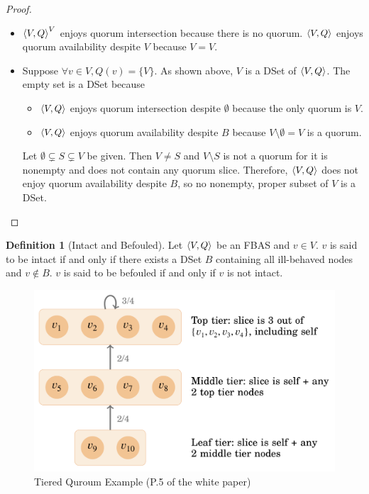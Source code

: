 \documentclass[12pt, psamsfonts]{amsart}
\theoremstyle{definition}
\newtheorem{defn}[thm]{Definition}
\theoremstyle{remark}
\numberwithin{equation}{subsection}
\begin{document}
\begin{proof}
    $ $
    \begin{itemize}
        \item
            $\ev{V, Q}^V$ enjoys quorum intersection because there is no quorum.
            $\ev{V, Q}$ enjoys quorum availability despite $V$ because $V = V$.
        \item
            Suppose $\forall v \in V, Q(v) = \{ V \}$.
            As shown above, $V$ is a DSet of $\ev{V, Q}$.
            The empty set is a DSet because
            \begin{itemize}
                \item
                    $\ev{V, Q}$ enjoys quorum intersection despite $\emptyset$ because the only quorum is $V$.
                \item
                    $\ev{V, Q}$ enjoys quorum availability despite $B$ because $V \setminus \emptyset = V$ is a quorum.
            \end{itemize}
            Let $\emptyset \subsetneq S \subsetneq V$ be given.
            Then $V \ne S$ and $V \setminus S$ is not a quorum for it is nonempty and does not contain any quorum slice.
            Therefore, $\ev{V, Q}$ does not enjoy quorum availability despite $B$, so no nonempty, proper subset of $V$ is a DSet.
    \end{itemize}
\end{proof}

\begin{defn}[Intact and Befouled]\label{def_intact_befouled}
    Let $\ev{V, Q}$ be an FBAS and $v \in V$.
    $v$ is said to be intact if and only if there exists a DSet $B$ containing all ill-behaved nodes and $v \notin B$.
    $v$ is said to be befouled if and only if $v$ is not intact.
\end{defn}

\begin{figure}[!htb]
    \includegraphics[width=.5\linewidth]{img/tiered_quorum_example.jpeg}
        \caption{Tiered Quroum Example (P.5 of the white paper)}
    \label{fig:tiered_quorum_example}
\end{figure}
\end{document}
